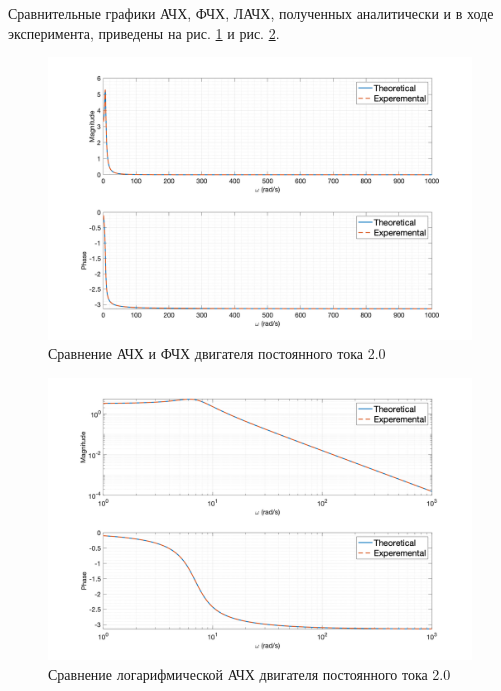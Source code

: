 Сравнительные графики АЧХ, ФЧХ, ЛАЧХ, полученных аналитически и в ходе эксперимента, приведены на рис. \ref{fig:task2_freq_resp_cmp_lin} и рис. \ref{fig:task2_freq_resp_cmp_loglog}.
\begin{figure}[ht!]
    \centering
    \includegraphics[width=\textwidth]{media/plots/task2_freq_resp_cmp_lin.png}
    \caption{Сравнение АЧХ и ФЧХ двигателя постоянного тока 2.0}
    \label{fig:task2_freq_resp_cmp_lin}
\end{figure}
\begin{figure}[ht!]
    \centering
    \includegraphics[width=\textwidth]{media/plots/task2_freq_resp_cmp_loglog.png}
    \caption{Сравнение логарифмической АЧХ двигателя постоянного тока 2.0}
    \label{fig:task2_freq_resp_cmp_loglog}
\end{figure}

